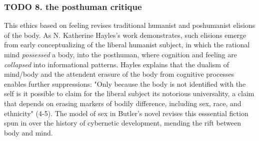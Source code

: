 \documentclass[11pt]{article}
\begin{document}
\subsubsection{{\bfseries\sffamily TODO} 8. the posthuman critique}
\label{sec:orge75bf75}
This ethics based on feeling revises traditional humanist and
poshumanist elisions of the body. As N. Katherine Hayles's work
demonstrates, such elisions emerge from early conceptualizing of the
liberal humanist subject, in which the rational mind \emph{possessed} a
body, into the posthuman, where cognition and feeling are \emph{collapsed}
into informational patterns. Hayles explains that the dualism of
mind/body and the attendent erasure of the body from cognitive
processes enables further suppressions: "Only because the body is not
identified with the self is it possible to claim for the liberal
subject its notorious universality, a claim that depends on erasing
markers of bodily difference, including sex, race, and ethnicity"
(4-5). The model of sex in Butler's novel revises this esssential
fiction spun in over the history of cybernetic development, mending
the rift between body and mind.
\end{document}
